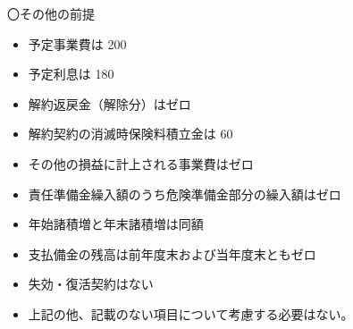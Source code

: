 \documentclass[report,gutter=10mm,fore-edge=10mm,uplatex,dvipdfmx]{jlreq}
\begin{document}
〇その他の前提 
\begin{itemize}
\item 予定事業費は 200 
\item 予定利息は 180
\item 解約返戻金（解除分）はゼロ 
\item 解約契約の消滅時保険料積立金は 60
\item その他の損益に計上される事業費はゼロ
\item 責任準備金繰入額のうち危険準備金部分の繰入額はゼロ
\item 年始諸積増と年末諸積増は同額
\item 支払備金の残高は前年度末および当年度末ともゼロ 
\item 失効・復活契約はない
\item 上記の他、記載のない項目について考慮する必要はない。
\end{itemize}

\end{document}
